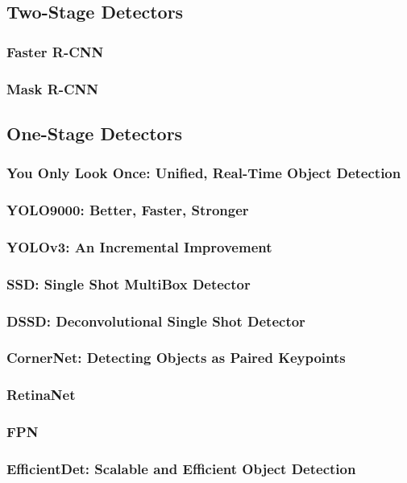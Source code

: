 \documentclass[12pt, letterpaper, twoside]{article}
\begin{document}
\subsection{Two-Stage Detectors}
\subsubsection{Faster R-CNN}
\subsubsection{Mask R-CNN}

\subsection{One-Stage Detectors}
\subsubsection{You Only Look Once: Unified, Real-Time Object Detection}
\subsubsection{YOLO9000: Better, Faster, Stronger}
\subsubsection{YOLOv3: An Incremental Improvement}
\subsubsection{SSD: Single Shot MultiBox Detector}
\subsubsection{DSSD: Deconvolutional Single Shot Detector}
\subsubsection{CornerNet: Detecting Objects as Paired Keypoints}
\subsubsection{RetinaNet}
\subsubsection{FPN}
\subsubsection{EfficientDet: Scalable and Efficient Object Detection}
\end{document}
